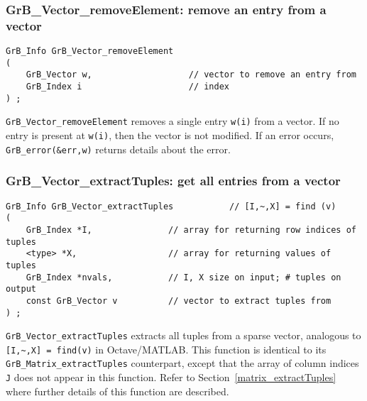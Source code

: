 \documentclass[12pt]{article}
\begin{document}
{\subsubsection{{\sf GrB\_Vector\_removeElement:} remove an entry from a vector}
\label{vector_removeElement}

\begin{mdframed}[userdefinedwidth=6in]
{\footnotesize
\begin{verbatim}
GrB_Info GrB_Vector_removeElement
(
    GrB_Vector w,                   // vector to remove an entry from
    GrB_Index i                     // index
) ;
\end{verbatim} } \end{mdframed}

\verb'GrB_Vector_removeElement' removes a single entry \verb'w(i)' from a vector.
If no entry is present at \verb'w(i)', then the vector is not modified.
If an error occurs, \verb'GrB_error(&err,w)' returns details about the error.

\subsubsection{{\sf GrB\_Vector\_extractTuples:} get all entries from a vector}
\label{vector_extractTuples}

\begin{mdframed}[userdefinedwidth=6in]
{\footnotesize
\begin{verbatim}
GrB_Info GrB_Vector_extractTuples           // [I,~,X] = find (v)
(
    GrB_Index *I,               // array for returning row indices of tuples
    <type> *X,                  // array for returning values of tuples
    GrB_Index *nvals,           // I, X size on input; # tuples on output
    const GrB_Vector v          // vector to extract tuples from
) ;
\end{verbatim} } \end{mdframed}

\verb'GrB_Vector_extractTuples' extracts all tuples from a sparse vector,
analogous to \verb'[I,~,X] = find(v)' in Octave/MATLAB.  This function is
identical to its \verb'GrB_Matrix_extractTuples' counterpart, except that the
array of column indices \verb'J' does not appear in this function.  Refer to
Section~\ref{matrix_extractTuples} where further details of this function are
described.

}
\end{document}
